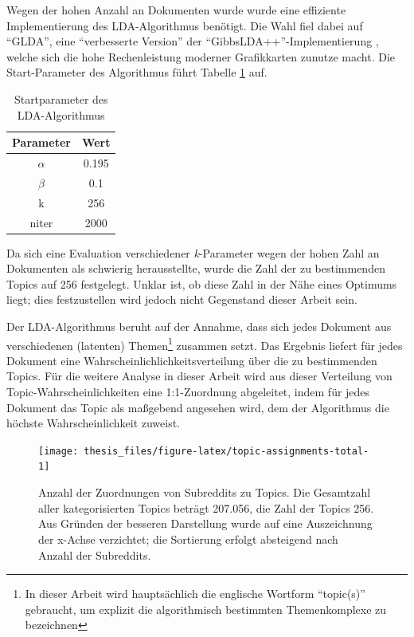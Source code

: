 \documentclass[11pt,a4paper,twoside]{article}
\let\rmarkdownfootnote\footnote%
\def\footnote{\protect\rmarkdownfootnote}
\begin{document}
Wegen der hohen Anzahl an Dokumenten wurde wurde eine effiziente
Implementierung des LDA-Algorithmus benötigt. Die Wahl fiel dabei auf
\enquote{GLDA}, eine \enquote{verbesserte Version} \autocite{Lu2013} der
\enquote{GibbsLDA++}-Implementierung \autocite{Phan2007}, welche sich
die hohe Rechenleistung moderner Grafikkarten zunutze macht. Die
Start-Parameter des Algorithmus führt Tabelle \ref{tab:lda-params} auf.

\begin{table}

\caption{\label{tab:lda-params}Startparameter des LDA-Algorithmus}
\centering
\begin{tabular}[t]{cc}
\toprule
Parameter & Wert\\
\midrule
$\alpha$ & 0.195\\
$\beta$ & 0.1\\
k & 256\\
niter & 2000\\
\bottomrule
\end{tabular}
\end{table}

Da sich eine Evaluation verschiedener \emph{k}-Parameter wegen der hohen
Zahl an Dokumenten als schwierig herausstellte, wurde die Zahl der zu
bestimmenden Topics auf 256 festgelegt. Unklar ist, ob diese Zahl in der
Nähe eines Optimums liegt; dies festzustellen wird jedoch nicht
Gegenstand dieser Arbeit sein.

Der LDA-Algorithmus beruht auf der Annahme, dass sich jedes Dokument aus
verschiedenen (latenten) Themen\footnote{In dieser Arbeit wird
  hauptsächlich die englische Wortform \enquote{topic(s)} gebraucht, um
  explizit die algorithmisch bestimmten Themenkomplexe zu bezeichnen}
zusammen setzt. Das Ergebnis liefert für jedes Dokument eine
Wahrscheinlichlichkeitsverteilung über die zu bestimmenden Topics. Für
die weitere Analyse in dieser Arbeit wird aus dieser Verteilung von
Topic-Wahrscheinlichkeiten eine 1:1-Zuordnung abgeleitet, indem für
jedes Dokument das Topic als maßgebend angesehen wird, dem der
Algorithmus die höchste Wahrscheinlichkeit zuweist.







\begin{figure}

{\centering \texttt{[image: thesis\_files/figure-latex/topic-assignments-total-1]} 

}

\caption{Anzahl der Zuordnungen von Subreddits
zu Topics. Die Gesamtzahl aller kategorisierten Topics beträgt 207.056,
die Zahl der Topics 256. Aus Gründen der besseren Darstellung wurde auf
eine Auszeichnung der x-Achse verzichtet; die Sortierung erfolgt
absteigend nach Anzahl der Subreddits.}\label{fig:topic-assignments-total}
\end{figure}
\end{document}

